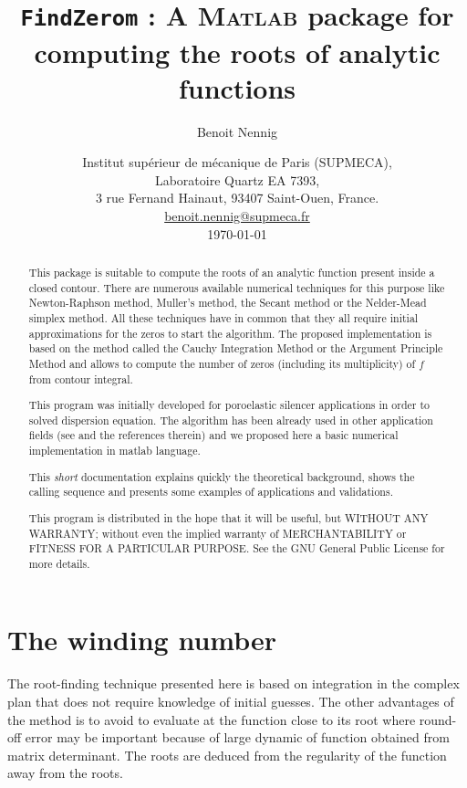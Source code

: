 \documentclass[a4paper,10pt]{article}
\title{\texttt{FindZerom} : A \textsc{Matlab} package for computing the roots of analytic functions}
\author{Benoit Nennig}
\date{Institut sup\'erieur de m\'ecanique de Paris (SUPMECA),\\ Laboratoire Quartz EA 7393,\\
3 rue Fernand Hainaut, 93407 Saint-Ouen, France.\\[0.5cm]
\url{benoit.nennig@supmeca.fr}\\[0.5cm]
\today}
\begin{document}
\maketitle
\begin{abstract}
This package is suitable to compute the roots of an analytic function present inside a closed contour. There are numerous available numerical techniques for this purpose like Newton-Raphson method, Muller's method, the Secant method or the Nelder-Mead simplex method. All these techniques have in common that they all require initial approximations for the zeros to start the algorithm. The proposed implementation is based on the method called the Cauchy Integration Method  or the Argument Principle Method and allows to compute the number of zeros (including its multiplicity) of $f$ from contour integral.

This program was initially developed for poroelastic silencer applications\cite{Nennig:2010} in order to solved dispersion equation. The algorithm has been already used in other application fields (see \cite{Delves:1967,Chen:2000,Kravanja:2000} and the references therein) and we proposed here a basic numerical implementation in matlab language.

This \emph{short} documentation explains quickly the theoretical background, shows the calling sequence and presents some examples of applications and validations.

This program is distributed in the hope that it will be useful, but WITHOUT ANY WARRANTY; without even the implied warranty of    MERCHANTABILITY or FITNESS FOR A PARTICULAR PURPOSE.  See the GNU General Public License for more details.

\end{abstract}


\section{The winding number}
The root-finding technique presented here is based on integration in the complex plan that does not require knowledge of initial guesses. 
The other advantages of the method is to avoid to evaluate at the function close to its root where round-off error may be important because of large dynamic of function obtained from matrix determinant. The roots are deduced from the regularity of the function away from the roots.
\end{document}
